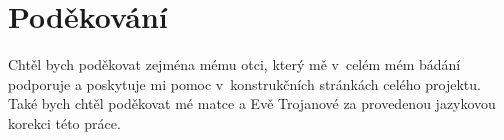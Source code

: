 \vfill

\vglue 14cm

\section*{Poděkování}

\begin{spacing}{1.3}
Chtěl bych poděkovat zejména mému otci, který mě v~celém mém bádání podporuje a poskytuje mi pomoc v~konstrukčních stránkách celého projektu. Také bych chtěl poděkovat mé matce a Evě Trojanové za provedenou jazykovou korekci této práce.
\end{spacing}
